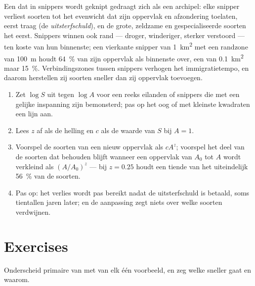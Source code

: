 \begin{proposition}[Versnippering]\label{prop:b1:ecosystem-dynamics:fragmentation}
Een  dat in snippers wordt geknipt gedraagt zich als een archipel:
elke snipper verliest soorten tot het evenwicht dat zijn oppervlak en
afzondering toelaten, eerst traag (de \emph{uitsterfschuld}), en de grote,
zeldzame en gespecialiseerde soorten het eerst. Snippers winnen ook rand ---
droger, winderiger, sterker verstoord --- ten koste van hun binnenste; een
vierkante snipper van \qty{1}{km^2} met een randzone van \qty{100}{m} houdt
\qty{64}{\%} van zijn oppervlak als binnenste over, een van \qty{0.1}{km^2}
maar \qty{15}{\%}. Verbindingszones tussen snippers verhogen het
immigratietempo, en daarom herstellen zij soorten sneller dan zij oppervlak
toevoegen.
\end{proposition}

\begin{method}\label{met:b1:ecosystem-dynamics:sar}
\begin{enumerate}
  \item Zet $\log S$ uit tegen $\log A$ voor een reeks eilanden of
        snippers die met een gelijke inspanning zijn bemonsterd; pas op
        het oog of met kleinste kwadraten een lijn aan.
  \item Lees $z$ af als de helling en $c$ als de waarde van $S$ bij
        $A = 1$.
  \item Voorspel de soorten van een nieuw oppervlak als $cA^z$; voorspel
        het deel van de soorten dat behouden blijft wanneer een oppervlak
        van $A_0$ tot $A$ wordt verkleind als $(A/A_0)^z$ --- bij
        $z = 0.25$ houdt een tiende van het  uiteindelijk
        \qty{56}{\%} van de soorten.
  \item Pas op: het verlies wordt pas bereikt nadat de uitsterfschuld is
        betaald, soms tientallen jaren later; en de aanpassing zegt niets
        over welke soorten verdwijnen.
\end{enumerate}
\end{method}

\section{Exercises}

\begin{exercise}[$\star$]\label{exo:b1:ecosystem-dynamics:1}
Onderscheid primaire van  met van elk één voorbeeld, en
zeg welke sneller gaat en waarom.
\end{exercise}

